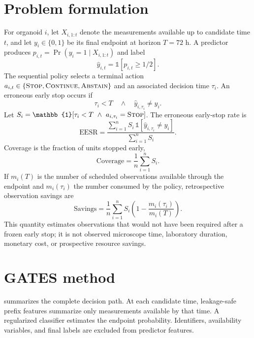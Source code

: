\documentclass[11pt,twocolumn]{article}
\newcommand{\eesr}{\mathrm{EESR}}
\newcommand{\stopstate}{\textsc{Stop}\xspace}
\newcommand{\continuestate}{\textsc{Continue}\xspace}
\newcommand{\abstainstate}{\textsc{Abstain}\xspace}
\begin{document}
\section{Problem formulation}

For organoid $i$, let $X_{i,1:t}$ denote the measurements available up to candidate time $t$, and
let $y_i\in\{0,1\}$ be its final endpoint at horizon $T=72$ h. A predictor produces
$p_{i,t}=\Pr(y_i=1\mid X_{i,1:t})$ and label
\begin{equation}
  \widehat y_{i,t}=\mathbb{1}[p_{i,t}\geq 1/2].
\end{equation}
The sequential policy selects a terminal action
$a_{i,t}\in\{\stopstate,\continuestate,\abstainstate\}$ and an associated decision time
$\tau_i$. An erroneous early stop occurs if
\begin{equation}
  \tau_i<T \quad\land\quad \widehat y_{i,\tau_i}\neq y_i.
\end{equation}
Let $S_i=\mathbb{1}[\tau_i<T\ \land\ a_{i,\tau_i}=\stopstate]$. The erroneous early-stop rate is
\begin{equation}
  \eesr=
  \frac{\sum_{i=1}^{n} S_i\,\mathbb{1}[\widehat y_{i,\tau_i}\neq y_i]}
       {\sum_{i=1}^{n} S_i}.
  \label{eq:eesr}
\end{equation}
Coverage is the fraction of units stopped early,
\begin{equation}
  \mathrm{Coverage}=\frac{1}{n}\sum_{i=1}^{n}S_i.
\end{equation}
If $m_i(T)$ is the number of scheduled observations available through the endpoint and
$m_i(\tau_i)$ the number consumed by the policy, retrospective observation savings are
\begin{equation}
  \mathrm{Savings}=\frac{1}{n}\sum_{i=1}^{n}
  S_i\left(1-\frac{m_i(\tau_i)}{m_i(T)}\right).
  \label{eq:savings}
\end{equation}
This quantity estimates observations that would not have been required after a frozen early stop;
it is not observed microscope time, laboratory duration, monetary cost, or prospective resource
savings.

\section{GATES method}

 summarizes the complete decision path. At each candidate time, leakage-safe
prefix features summarize only measurements available by that time. A regularized classifier
estimates the endpoint probability. Identifiers, availability variables, and final labels are
excluded from predictor features.
\end{document}
